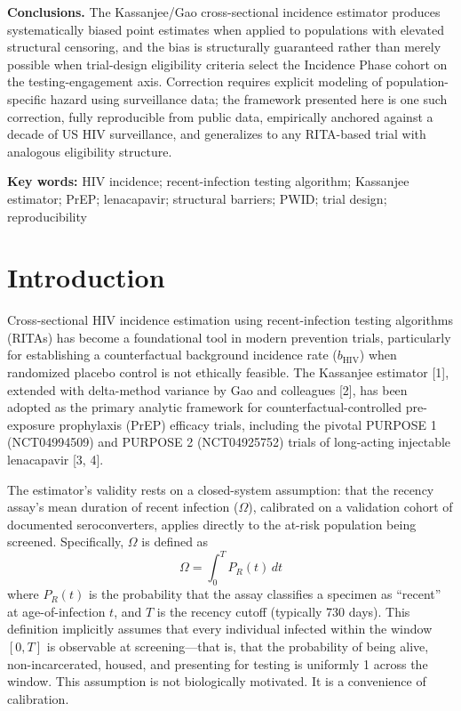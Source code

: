 \documentclass[12pt]{article}
\begin{document}
\medskip
\noindent\textbf{Conclusions.} The Kassanjee/Gao cross-sectional incidence estimator produces systematically biased point estimates when applied to populations with elevated structural censoring, and the bias is structurally guaranteed rather than merely possible when trial-design eligibility criteria select the Incidence Phase cohort on the testing-engagement axis. Correction requires explicit modeling of population-specific hazard using surveillance data; the framework presented here is one such correction, fully reproducible from public data, empirically anchored against a decade of US HIV surveillance, and generalizes to any RITA-based trial with analogous eligibility structure.

\medskip
\noindent\textbf{Key words:} HIV incidence; recent-infection testing algorithm; Kassanjee estimator; PrEP; lenacapavir; structural barriers; PWID; trial design; reproducibility

\newpage


\section{Introduction}

Cross-sectional HIV incidence estimation using recent-infection testing algorithms (RITAs) has become a foundational tool in modern prevention trials, particularly for establishing a counterfactual background incidence rate ($b_{\mathrm{HIV}}$) when randomized placebo control is not ethically feasible. The Kassanjee estimator [1], extended with delta-method variance by Gao and colleagues [2], has been adopted as the primary analytic framework for counterfactual-controlled pre-exposure prophylaxis (PrEP) efficacy trials, including the pivotal PURPOSE 1 (NCT04994509) and PURPOSE 2 (NCT04925752) trials of long-acting injectable lenacapavir [3, 4].

The estimator's validity rests on a closed-system assumption: that the recency assay's mean duration of recent infection ($\Omega$), calibrated on a validation cohort of documented seroconverters, applies directly to the at-risk population being screened. Specifically, $\Omega$ is defined as
\begin{equation}
\Omega = \int_0^T P_R(t)\, dt
\end{equation}
where $P_R(t)$ is the probability that the assay classifies a specimen as ``recent'' at age-of-infection $t$, and $T$ is the recency cutoff (typically 730 days). This definition implicitly assumes that every individual infected within the window $[0, T]$ is observable at screening---that is, that the probability of being alive, non-incarcerated, housed, and presenting for testing is uniformly 1 across the window. This assumption is not biologically motivated. It is a convenience of calibration.
\end{document}
